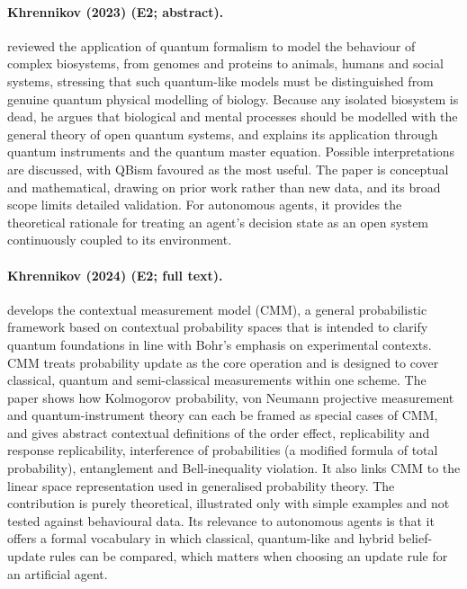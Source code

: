 \documentclass[10pt,a4paper]{article}
\begin{document}
\paragraph{Khrennikov (2023) (E2; abstract).} \citet{Khrennikov2023a} reviewed the application of quantum formalism to model the behaviour of complex biosystems, from genomes and proteins to animals, humans and social systems, stressing that such quantum-like models must be distinguished from genuine quantum physical modelling of biology. Because any isolated biosystem is dead, he argues that biological and mental processes should be modelled with the general theory of open quantum systems, and explains its application through quantum instruments and the quantum master equation. Possible interpretations are discussed, with QBism favoured as the most useful. The paper is conceptual and mathematical, drawing on prior work rather than new data, and its broad scope limits detailed validation. For autonomous agents, it provides the theoretical rationale for treating an agent's decision state as an open system continuously coupled to its environment.

\paragraph{Khrennikov (2024) (E2; full text).} \citet{Khrennikov2023b} develops the contextual measurement model (CMM), a general probabilistic framework based on contextual probability spaces that is intended to clarify quantum foundations in line with Bohr's emphasis on experimental contexts. CMM treats probability update as the core operation and is designed to cover classical, quantum and semi-classical measurements within one scheme. The paper shows how Kolmogorov probability, von Neumann projective measurement and quantum-instrument theory can each be framed as special cases of CMM, and gives abstract contextual definitions of the order effect, replicability and response replicability, interference of probabilities (a modified formula of total probability), entanglement and Bell-inequality violation. It also links CMM to the linear space representation used in generalised probability theory. The contribution is purely theoretical, illustrated only with simple examples and not tested against behavioural data. Its relevance to autonomous agents is that it offers a formal vocabulary in which classical, quantum-like and hybrid belief-update rules can be compared, which matters when choosing an update rule for an artificial agent.
\end{document}
